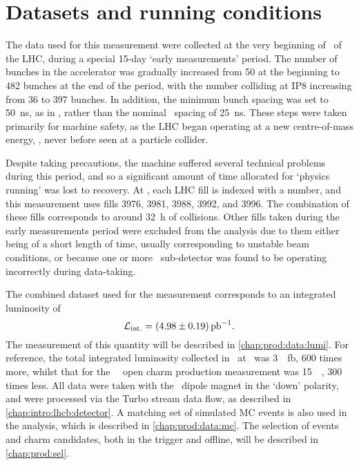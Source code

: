 \chapter{Datasets and running conditions}
\label{chap:prod:data}

The data used for this measurement were collected at the very beginning of 
\runtwo\ of the \ac{LHC}, during a special 15-day `early measurements' period.
The number of bunches in the accelerator was gradually increased from 50 at the 
beginning to 482 bunches at the end of the period, with the number colliding at 
IP8 increasing from 36 to 397 bunches.
In addition, the minimum bunch spacing was set to \SI{50}{\nano\second}, as in 
\runone, rather than the nominal \runtwo\ spacing of \SI{25}{\nano\second}.
These steps were taken primarily for machine safety, as the \ac{LHC} began 
operating at a new centre-of-mass energy, , never before seen at a 
particle collider.

Despite taking precautions, the machine suffered several technical problems 
during this period, and so a significant amount of time allocated for `physics 
running' was lost to recovery.
At \lhcb, each \ac{LHC} fill is indexed with a number, and this measurement 
uses fills 3976, 3981, 3988, 3992, and 3996.
The combination of these fills corresponds to around \SI{32}{\hour} of 
collisions.
Other fills taken during the early measurements period were excluded from the 
analysis due to them either being of a short length of time, usually 
corresponding to unstable beam conditions, or because one or more \lhcb\ 
sub-detector was found to be operating incorrectly during data-taking.

The combined dataset used for the measurement corresponds to an integrated 
luminosity of
\begin{equation}
  \intlumi = \SI{\xsectotlumi}{\per\pico\barn}.
  \label{eqn:prod:xsectotlumi}
\end{equation}
The measurement of this quantity will be described in 
\cref{chap:prod:data:lumi}.
For reference, the total integrated luminosity collected in \runone\ at \lhcb\ 
was \SI{3}{\per\femto\barn}, 600 times more, whilst that for the \ 
\lhcb\ open charm production measurement was \SI{15}{\per\nb}, 300 times less.
All data were taken with the \lhcb\ dipole magnet in the `down' polarity, and 
were processed via the Turbo stream data flow, as described in 
\cref{chap:intro:lhcb:detector}.
A matching set of simulated \ac{MC} events is also used in the analysis, which 
is described in \cref{chap:prod:data:mc}.
The selection of events and charm candidates, both in the trigger and offline, 
will be described in \cref{chap:prod:sel}.


